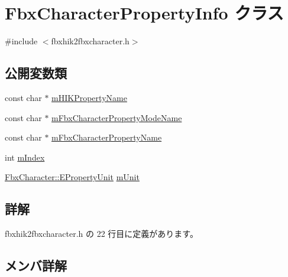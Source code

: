 \hypertarget{class_fbx_character_property_info}{}\section{Fbx\+Character\+Property\+Info クラス}
\label{class_fbx_character_property_info}


{\ttfamily \#include $<$fbxhik2fbxcharacter.\+h$>$}

\subsection*{公開変数類}
\begin{DoxyCompactItemize}
\item 
const char $\ast$ \hyperlink{class_fbx_character_property_info_a8d6a7c9e15c0944ddaff38b20d3c5bb8}{m\+H\+I\+K\+Property\+Name}
\item 
const char $\ast$ \hyperlink{class_fbx_character_property_info_aaebf44fac9acc7d36352077a50345761}{m\+Fbx\+Character\+Property\+Mode\+Name}
\item 
const char $\ast$ \hyperlink{class_fbx_character_property_info_a0f8c79a2e71440c4cbc4ce1ef5f6eef7}{m\+Fbx\+Character\+Property\+Name}
\item 
int \hyperlink{class_fbx_character_property_info_a62c37badd98e865a666616e877d2ff49}{m\+Index}
\item 
\hyperlink{class_fbx_character_aa48fb13a1c63e6a69ce9fa251993f8d5}{Fbx\+Character\+::\+E\+Property\+Unit} \hyperlink{class_fbx_character_property_info_ad22617f1c6c63b559f7da55af1519086}{m\+Unit}
\end{DoxyCompactItemize}


\subsection{詳解}


 fbxhik2fbxcharacter.\+h の 22 行目に定義があります。



\subsection{メンバ詳解}
\mbox{\label{class_fbx_character_property_info_aaebf44fac9acc7d36352077a50345761}} 

